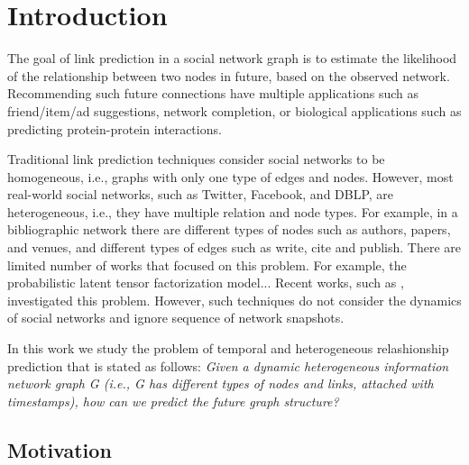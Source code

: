 \section{Introduction}
\label{Sec:Introduction}


The goal of link prediction in a social network graph \cite{liben2007link} is to estimate the likelihood of the relationship between two nodes in future, based on the observed network. Recommending such future connections have multiple applications such as friend/item/ad suggestions, network completion, or biological applications such as predicting protein-protein interactions.


Traditional link prediction techniques \cite{liben2007link} consider social networks to be homogeneous, i.e., graphs with only one type of edges and nodes. However, most real-world social networks, such as Twitter, Facebook, and DBLP, are heterogeneous, i.e., they have multiple relation and node types. For example, in a bibliographic network there are different types of nodes such as authors, papers, and venues, and different types of edges such as write, cite and publish. There are limited number of works that focused on this problem. For example, the probabilistic latent tensor factorization model... Recent works, such as \cite{sun2011pathsim}, investigated this problem. However, such techniques do not consider the dynamics of social networks and ignore sequence of network snapshots. 
\cite{Zhu2016} \cite{sun2011pathsim} \cite{Sun:2012:HRP:2124295.2124373}  \cite{huang2016meta} \cite{wang2016relsim} \cite{sun2013pathselclus} \cite{sun2011ASONAM} \cite{Yang2012} \cite{liben2007link}


In this work we study the problem of temporal and heterogeneous relashionship prediction that is stated as follows: \textit{Given a dynamic heterogeneous information network graph G (i.e., G has different types of nodes and links, attached with timestamps), how can we predict the future graph structure?}



\subsection{Motivation}

